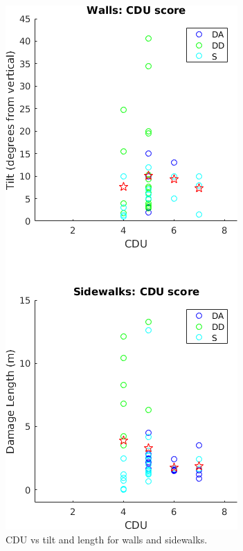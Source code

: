 \documentclass[final,12pt,times,twocolumn,authoryear]{elsarticle}
\begin{document}
\begin{figure}[hbt]
	\centering
	\includegraphics[width=\linewidth]{fig/CDUverticalplot}
	\caption{CDU vs tilt and length for walls and sidewalks.}
	\label{fig:cduvert}
\end{figure}
\end{document}
